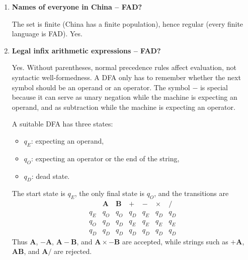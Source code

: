 \documentclass[11pt,openany]{book}
\begin{document}
\begin{enumerate}[{1.}1.]
\begin{enumerate}
\item The machine first waits for two occurrences of $\pmb{a}$. The state $q_2$ is reached as soon as the second $\pmb{a}$ is seen. After that, only the number of $\pmb{b}$s modulo $3$ matters:
\[
q_2 \equiv 0,\qquad q_4 \equiv 1,\qquad q_3 \equiv 2 \pmod 3.
\]
Since $q_2$ and $q_3$ are final and $q_4$ is not, the language is
\[
\{ \pmb{b}^i\pmb{a}\pmb{b}^j\pmb{a}x \mid i,j\geq 0,\ x\in\{\pmb{a},\pmb{b}\}^*,\ |x|_{\pmb{b}}\equiv 0 \text{ or }2 \pmod 3 \}.
\]
Equivalently: the string must contain at least two $\pmb{a}$s, and after the second $\pmb{a}$ the number of $\pmb{b}$s must not be congruent to $1 \pmod 3$.
\end{enumerate}

\item \textbf{Names of everyone in China -- FAD?}

The set is finite (China has a finite population), hence regular (every finite language is FAD). Yes.

\item \textbf{Legal infix arithmetic expressions -- FAD?}

Yes. Without parentheses, normal precedence rules affect evaluation, not syntactic well-formedness. A DFA only has to remember whether the next symbol should be an operand or an operator. The symbol $\pmb{-}$ is special because it can serve as unary negation while the machine is expecting an operand, and as subtraction while the machine is expecting an operator.

A suitable DFA has three states:
\begin{itemize}
\item $q_E$: expecting an operand,
\item $q_O$: expecting an operator or the end of the string,
\item $q_D$: dead state.
\end{itemize}
The start state is $q_E$, the only final state is $q_O$, and the transitions are
\[
\begin{array}{c|cccccc}
 & \pmb{A} & \pmb{B} & \pmb{+} & \pmb{-} & \pmb{\times} & \pmb{/} \\\hline
q_E & q_O & q_O & q_D & q_E & q_D & q_D \\
q_O & q_D & q_D & q_E & q_E & q_E & q_E \\
q_D & q_D & q_D & q_D & q_D & q_D & q_D
\end{array}
\]
Thus $\pmb{A}$, $\pmb{-A}$, $\pmb{A-B}$, and $\pmb{A\times-B}$ are accepted, while strings such as $\pmb{+A}$, $\pmb{AB}$, and $\pmb{A/}$ are rejected.


\end{enumerate}
\end{document}
